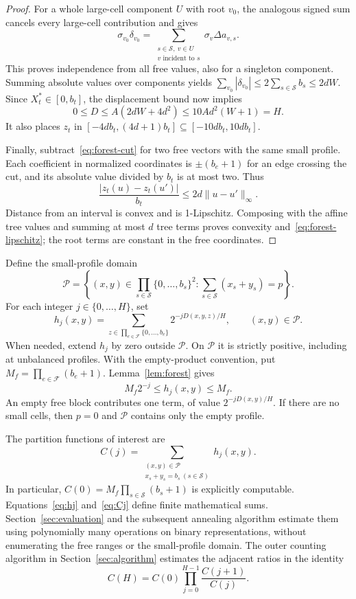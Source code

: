 \begin{proof}
For a whole large-cell component $U$ with root $v_0$, the analogous
signed sum cancels every large-cell contribution and gives
\[
\sigma_{v_0}\delta_{v_0}
=\sum_{\substack{s\in\mathcal S,\ v\in U\\v\text{ incident to }s}}
\sigma_v\Delta a_{v,s}.
\]
This proves independence from all free values, also for a singleton
component.  Summing absolute values over components yields
$\sum_{v_0}|\delta_{v_0}|\le2\sum_{s\in\mathcal S}b_s\le2dW$.
Since $X^*_t\in[0,b_t]$, the displacement bound now implies
\[
0\le D\le A(2dW+4d^2)\le10Ad^2(W+1)=H.
\]
It also places $z_t$ in
$[-4db_t,(4d+1)b_t]\subseteq[-10db_t,10db_t]$.

Finally, subtract~\eqref{eq:forest-cut} for two free vectors with the
same small profile.  Each coefficient in normalized coordinates is
$\pm(b_e+1)$ for an edge crossing the cut, and its absolute value
divided by $b_t$ is at most two.  Thus
\[
\frac{|z_t(u)-z_t(u')|}{b_t}
\le2d\|u-u'\|_\infty.
\]
Distance from an interval is convex and is 1-Lipschitz.  Composing
with the affine tree values and summing at most $d$ tree terms proves
convexity and~\eqref{eq:forest-lipschitz}; the root terms are constant
in the free coordinates.
\end{proof}

Define the small-profile domain
\[
\mathcal P=\left\{(x,y)\in\prod_{s\in\mathcal S}
\{0,\ldots,b_s\}^2:
\sum_{s\in\mathcal S}(x_s+y_s)=p\right\}.
\]
For each integer $j\in\{0,\ldots,H\}$, set
\begin{equation}\label{eq:hj}
h_j(x,y)=
\sum_{z\in\prod_{e\in\mathcal F}\{0,\ldots,b_e\}}
2^{-jD(x,y,z)/H},\qquad (x,y)\in\mathcal P.
\end{equation}
When needed, extend $h_j$ by zero outside $\mathcal P$.  On
$\mathcal P$ it is strictly positive, including at unbalanced
profiles.  With the empty-product convention, put
$M_f=\prod_{e\in\mathcal F}(b_e+1)$.  Lemma~\ref{lem:forest} gives
\[
M_f2^{-j}\le h_j(x,y)\le M_f.
\]
An empty free block contributes one term, of value $2^{-jD(x,y)/H}$.
If there are no small cells, then $p=0$ and $\mathcal P$ contains
only the empty profile.

The partition functions of interest are
\begin{equation}\label{eq:Cj}
C(j)=\sum_{\substack{(x,y)\in\mathcal P\\
x_s+y_s=b_s\ (s\in\mathcal S)}}h_j(x,y).
\end{equation}
In particular,
$C(0)=M_f\prod_{s\in\mathcal S}(b_s+1)$ is explicitly computable.
Equations~\eqref{eq:hj} and~\eqref{eq:Cj} define finite mathematical
sums.  Section~\ref{sec:evaluation} and the subsequent annealing
algorithm estimate them using polynomially many operations on
binary representations, without enumerating the free ranges or the
small-profile domain. The outer counting algorithm in
Section~\ref{sec:algorithm} estimates the adjacent ratios in the identity
\[
 C(H)=C(0)\prod_{j=0}^{H-1}\frac{C(j+1)}{C(j)}.
\]

